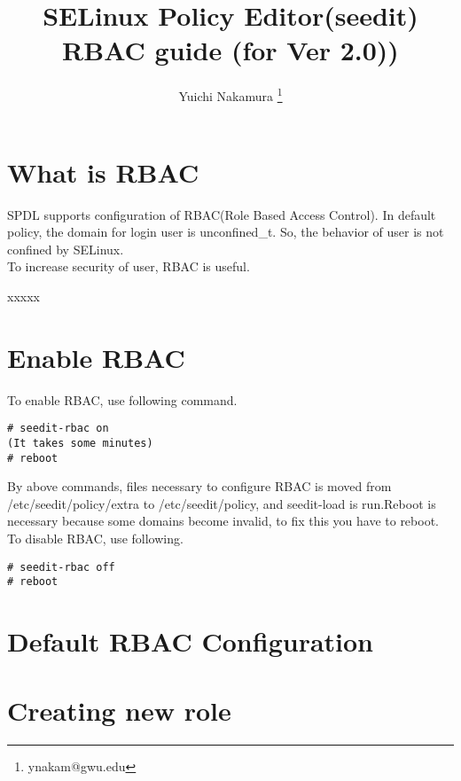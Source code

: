 \documentclass{article}
\title{SELinux Policy Editor(seedit) RBAC guide (for Ver 2.0))}
\author{Yuichi Nakamura \thanks{ynakam@gwu.edu}}
\begin{document}
\def\labelenumi{(\theenumi)}
\maketitle
\tableofcontents
\newpage


\section{What is RBAC}
SPDL supports configuration of RBAC(Role Based Access Control).
In default policy, the domain for login user is unconfined\_t.
So, the behavior of user is not confined by SELinux.\\

To increase security of user, RBAC is useful.

xxxxx

\section{Enable RBAC}
To enable RBAC, use following command.
\begin{verbatim}
# seedit-rbac on
(It takes some minutes)
# reboot
\end{verbatim}
By above commands, files necessary to configure RBAC is moved from
/etc/seedit/policy/extra to /etc/seedit/policy, and seedit-load is
run.Reboot is necessary because some domains become invalid, to fix this
you have to reboot.\\

To disable RBAC, use following.
\begin{verbatim}
# seedit-rbac off
# reboot
\end{verbatim}

\section{Default RBAC Configuration}


\section{Creating new role}
\end{document}
